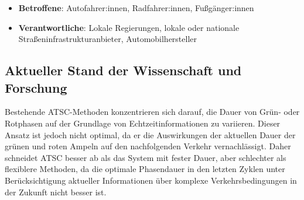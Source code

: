 \documentclass[
]{book}
\providecommand{\tightlist}{%
  \setlength{\itemsep}{0pt}\setlength{\parskip}{0pt}}
\begin{document}
\begin{itemize}
\tightlist
\item
  \textbf{Betroffene}: Autofahrer:innen, Radfahrer:innen, Fußgänger:innen
\item
  \textbf{Verantwortliche}: Lokale Regierungen, lokale oder nationale Straßeninfrastrukturanbieter, Automobilhersteller
\end{itemize}

\hypertarget{aktueller-stand-der-wissenschaft-und-forschung-15}{%
\subsection*{Aktueller Stand der Wissenschaft und Forschung}\label{aktueller-stand-der-wissenschaft-und-forschung-15}}

Bestehende ATSC-Methoden konzentrieren sich darauf, die Dauer von Grün- oder Rotphasen auf der Grundlage von Echtzeitinformationen zu variieren. Dieser Ansatz ist jedoch nicht optimal, da er die Auswirkungen der aktuellen Dauer der grünen und roten Ampeln auf den nachfolgenden Verkehr vernachlässigt. Daher schneidet ATSC besser ab als das System mit fester Dauer, aber schlechter als flexiblere Methoden, da die optimale Phasendauer in den letzten Zyklen unter Berücksichtigung aktueller Informationen über komplexe Verkehrsbedingungen in der Zukunft nicht besser ist.
\end{document}
